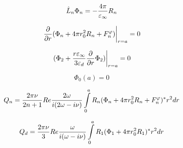 \documentclass{article}
\begin{document}
\[ \hat L_n \Phi_n = -\frac{4\pi}{\varepsilon_\infty}R_n\]

\[ \left.\frac{\partial }{\partial r} (\Phi_n  + 4\pi r_0^2R_n + F_n^\varphi)\right|_{ r = a} = 0 \]

\[ \left. (\Phi_2  + \frac{r \varepsilon_\infty}{3\varepsilon_d}\frac{\partial }{\partial r}\Phi_2)\right|_{ r = a} = 0 \]

\[ \Phi_0 (a) = 0\]

\[ Q_n = \frac{2\pi\nu}{2n+1}Re \frac{2\omega}{i(2\omega - i \nu)} \int\limits_0^a R_n(\Phi_n  + 4\pi r_0^2R_n + F_n^\varphi)^*r^2dr\]

\[ Q_d = \frac{2\pi\nu}{3}Re \frac{\omega}{i(\omega - i \nu)}\int\limits_0^a R_1(\Phi_1  + 4\pi r_0^2R_1 )^*r^2dr\]

\[ \]
\end{document}
